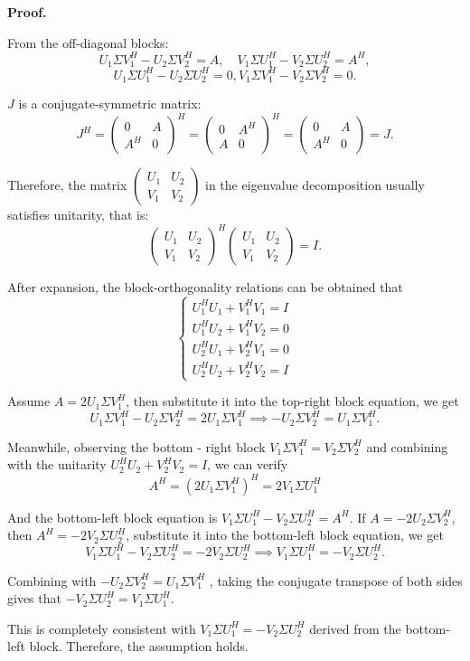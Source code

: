 \documentclass[a4paper, 11pt]{article}
\newenvironment{solution}
    {\textbf{Proof.}}
    {}
\begin{document}
\begin{solution}
\begin{enumerate}
	From the off-diagonal blocks:
$$
	U_1 \Sigma V_1^H - U_2 \Sigma V_2^H = A, \quad V_1 \Sigma U_1^H - V_2 \Sigma U_2^H = A^H,
$$
$$
    U_1 \Sigma U_1^H - U_2\Sigma U_2^H = 0,  V_1\Sigma V_1^H - V_2\Sigma V_2^H = 0.
$$

\(J\) is a conjugate-symmetric matrix:
$$
J^H=\begin{pmatrix}0&A\\A^H&0\end{pmatrix}^H=\begin{pmatrix}0&A^H\\A&0\end{pmatrix}^H=\begin{pmatrix}0&A\\A^H&0\end{pmatrix}=J.
$$

Therefore, the matrix \(\begin{pmatrix}U_1&U_2\\V_1&V_2\end{pmatrix}\) in the eigenvalue decomposition usually satisfies unitarity, that is:
$$
\begin{pmatrix}U_1&U_2\\V_1&V_2\end{pmatrix}^H\begin{pmatrix}U_1&U_2\\V_1&V_2\end{pmatrix}=I.
$$

After expansion, the block-orthogonality relations can be obtained that
$$
\begin{cases}U_1^HU_1 + V_1^HV_1 = I\\U_1^HU_2 + V_1^HV_2 = 0\\U_2^HU_1 + V_2^HV_1 = 0\\U_2^HU_2 + V_2^HV_2 = I\end{cases}
$$

Assume \(A = 2U_1\Sigma V_1^H\), then substitute it into the top-right block equation, we get
$$
U_1\Sigma V_1^H - U_2\Sigma V_2^H = 2U_1\Sigma V_1^H\implies - U_2\Sigma V_2^H = U_1\Sigma V_1^H.
$$

Meanwhile, observing the bottom - right block \(V_1\Sigma V_1^H = V_2\Sigma V_2^H\) and combining with the unitarity \(U_2^HU_2 + V_2^HV_2 = I\), we can verify
$$
A^H=(2U_1\Sigma V_1^H)^H = 2V_1\Sigma U_1^H
$$

And the bottom-left block equation is \(V_1\Sigma U_1^H - V_2\Sigma U_2^H = A^H\). If \(A = - 2U_2\Sigma V_2^H\), then \(A^H=-2V_2\Sigma U_2^H\), substitute it into the bottom-left block equation, we get
$$
V_1\Sigma U_1^H - V_2\Sigma U_2^H=-2V_2\Sigma U_2^H\implies V_1\Sigma U_1^H=-V_2\Sigma U_2^H.
$$

Combining with \(-U_2\Sigma V_2^H = U_1\Sigma V_1^H\) , taking the conjugate transpose of both sides gives that \(-V_2\Sigma U_2^H = V_1\Sigma U_1^H\).

This is completely consistent with \(V_1\Sigma U_1^H=-V_2\Sigma U_2^H\) derived from the bottom-left block. Therefore, the assumption holds.

	\end{enumerate}
\end{solution}
\end{document}
